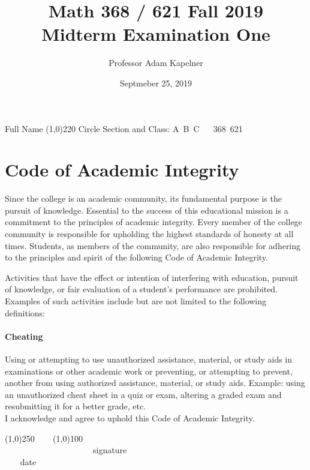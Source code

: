 \documentclass[12pt]{article}
\title{Math 368 / 621 Fall 2019 \\ Midterm Examination One}
\author{Professor Adam Kapelner}
\date{Septmeber 25, 2019}
\begin{document}
\maketitle

\noindent Full Name \line(1,0){220} Circle Section and Class: A~B~C ~~ 368~621 

\thispagestyle{empty}

\section*{Code of Academic Integrity}

\footnotesize
Since the college is an academic community, its fundamental purpose is the pursuit of knowledge. Essential to the success of this educational mission is a commitment to the principles of academic integrity. Every member of the college community is responsible for upholding the highest standards of honesty at all times. Students, as members of the community, are also responsible for adhering to the principles and spirit of the following Code of Academic Integrity.

Activities that have the effect or intention of interfering with education, pursuit of knowledge, or fair evaluation of a student's performance are prohibited. Examples of such activities include but are not limited to the following definitions:

\paragraph{Cheating} Using or attempting to use unauthorized assistance, material, or study aids in examinations or other academic work or preventing, or attempting to prevent, another from using authorized assistance, material, or study aids. Example: using an unauthorized cheat sheet in a quiz or exam, altering a graded exam and resubmitting it for a better grade, etc.
\\

\noindent I acknowledge and agree to uphold this Code of Academic Integrity. \\

\begin{center}
\line(1,0){250} ~~~ \line(1,0){100}\\
~~~~~~~~~~~~~~~~~~~~~signature~~~~~~~~~~~~~~~~~~~~~~~~~~~~~~~~~~~~~~~~~~~~~ date
\end{center}

\normalsize

\vspace{-1cm}
\end{document}
